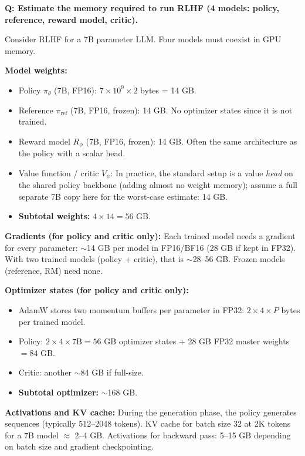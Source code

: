 
\begin{interviewq}
\textbf{Q: Estimate the memory required to run RLHF (4 models: policy, reference, reward model, critic).}

 \quad {} \quad \badgefreq{\freqmed}

\stronganswer

Consider RLHF for a 7B parameter LLM. Four models must coexist in GPU memory.

\textbf{Model weights:}
\begin{itemize}
    \item Policy $\pi_\theta$ (7B, FP16): $7 \times 10^9 \times 2$ bytes = 14 GB.
    \item Reference $\pi_{\text{ref}}$ (7B, FP16, frozen): 14 GB. No optimizer states since it is not trained.
    \item Reward model $R_\phi$ (7B, FP16, frozen): 14 GB. Often the same architecture as the policy with a scalar head.
    \item Value function / critic $V_\psi$: In practice, the standard setup is a value \textit{head} on the shared policy backbone (adding almost no weight memory); assume a full separate 7B copy here for the worst-case estimate: 14 GB.
    \item \textbf{Subtotal weights:} $4 \times 14 = 56$ GB.
\end{itemize}

\textbf{Gradients (for policy and critic only):} Each trained model needs a gradient for every parameter: $\sim$14 GB per model in FP16/BF16 (28 GB if kept in FP32). With two trained models (policy + critic), that is $\sim$28--56 GB. Frozen models (reference, RM) need none.

\textbf{Optimizer states (for policy and critic only):}
\begin{itemize}
    \item AdamW stores two momentum buffers per parameter in FP32: $2 \times 4 \times P$ bytes per trained model.
    \item Policy: $2 \times 4 \times 7\text{B} = 56$ GB optimizer states + 28 GB FP32 master weights $= 84$ GB.
    \item Critic: another $\sim$84 GB if full-size.
    \item \textbf{Subtotal optimizer:} $\sim$168 GB.
\end{itemize}

\textbf{Activations and KV cache:} During the generation phase, the policy generates sequences (typically 512--2048 tokens). KV cache for batch size 32 at 2K tokens for a 7B model $\approx$ 2--4 GB. Activations for backward pass: 5--15 GB depending on batch size and gradient checkpointing.


\end{interviewq}
